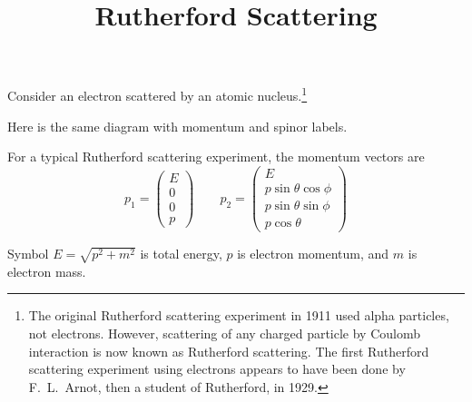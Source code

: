 \documentclass[12pt]{article}
\title{Rutherford Scattering}
\date{}
\begin{document}
\maketitle

\noindent
Consider an electron scattered by an atomic nucleus.\footnote{
The original Rutherford scattering experiment in 1911 used alpha particles, not electrons.
However, scattering of any charged particle by Coulomb interaction
is now known as Rutherford scattering.
The first Rutherford scattering experiment using electrons appears to have
been done by F.~L.~Arnot, then a student of Rutherford, in 1929.}
\begin{center}
\end{center}

\noindent
Here is the same diagram with momentum and spinor labels.
\begin{center}
\end{center}

\noindent
For a typical Rutherford scattering experiment, the momentum vectors are
\begin{equation*}
p_1=\begin{pmatrix}E\\0\\0\\p\end{pmatrix}\qquad
p_2=\begin{pmatrix}
E\\
p\sin\theta\cos\phi\\
p\sin\theta\sin\phi\\
p\cos\theta
\end{pmatrix}
\end{equation*}

\noindent
Symbol $E=\sqrt{p^2+m^2}$ is total energy, $p$ is electron momentum, and $m$ is electron mass.
\end{document}
